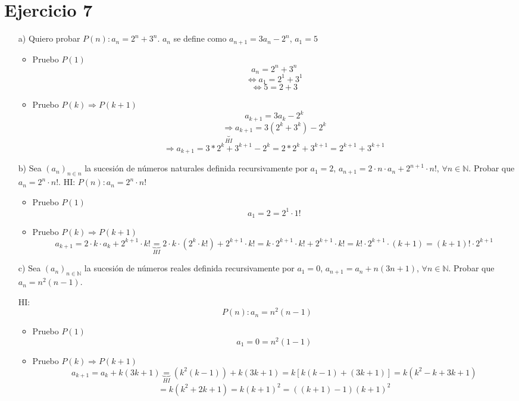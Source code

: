 \documentclass[10pt,a4paper]{article}
\begin{document}
\section*{Ejercicio 7}
\begin{enumerate}
\item[a)]Quiero probar $P(n):a_{n}=2^{n}+3^{n}$. $a_{n}$ se define como $a_{n+1}=3a_{n}-2^{n}$, $a_{1}=5$
	\begin{itemize}
	\item Pruebo $P(1)$
	$$a_{n}=2^{n}+3^{n}$$
	$$\Leftrightarrow a_{1}=2^{1}+3^{1}$$
	$$\Leftrightarrow 5 =2 +3$$
	
	\item Pruebo $P(k)\Rightarrow P(k+1)$
	$$a_{k+1}=3a_{k}-2^{k}$$
	$$\underbrace{ \Rightarrow}_{HI} a_{k+1}=3(2^{k}+3^{k})-2^{k}$$
	$$\Rightarrow a_{k+1}=3*2^{k}+3^{k+1}-2^{k}=2*2^{k}+3^{k+1}=2^{k+1}+3^{k+1}$$	
	\end{itemize}

\item[b)] Sea $(a_{n})_{n\in n}$ la sucesión de números naturales definida recursivamente por $a_{1}=2$,  $a_{n+1}=2\cdot n \cdot a_{n}+ 2^{n+1}\cdot n!$, $\forall n \in \mathbb{N}$. Probar que $a_{n}=2^{n}\cdot n!$. HI: $P(n):a_{n}=2^{n}\cdot n!$
	\begin{itemize}
	\item Pruebo $P(1)$
	$$a_{1}= 2= 2^{1}\cdot 1!$$
	
	\item Pruebo $P(k)\Rightarrow P(k+1)$
	$$a_{k+1}=2\cdot k \cdot a_{k}+ 2^{k+1}\cdot k!\underbrace{=}_{HI}2\cdot k \cdot   (2^{k}\cdot k!)  + 2^{k+1}\cdot k!= k \cdot   2^{k+1}\cdot k!  + 2^{k+1}\cdot k!= k!\cdot 2^{k+1}\cdot (k+1)= (k+1)!\cdot 2^{k+1}$$	
	\end{itemize}

\item[c)] Sea $(a_{n})_{n\in \mathbb{N}}$ la sucesión de números reales definida recursivamente por $a_{1}=0$, $a_{n+1}=a_{n}+n(3n+1)$, $\forall n\in \mathbb{N}$. Probar que $a_{n}=n^{2}(n-1)$.

HI: $$P(n):a_{n}=n^{2}(n-1)$$

	\begin{itemize}
	\item Pruebo $P(1)$
	$$a_{1}=0= n^{2}(1-1)$$
	
	\item Pruebo $P(k)\Rightarrow P(k+1)$
	$$a_{k+1}=a_{k}+k(3k+1) \underbrace{=}_{HI} (k^{2}(k-1))+k(3k+1)=k[k(k-1)+(3k+1)]= k(k^{2}-k+3k+1)$$
	$$=k(k^{2}+2k+1)=k(k+1)^{2}= ((k+1)-1)(k+1)^{2}$$
	\end{itemize}

\end{enumerate}
\end{document}
